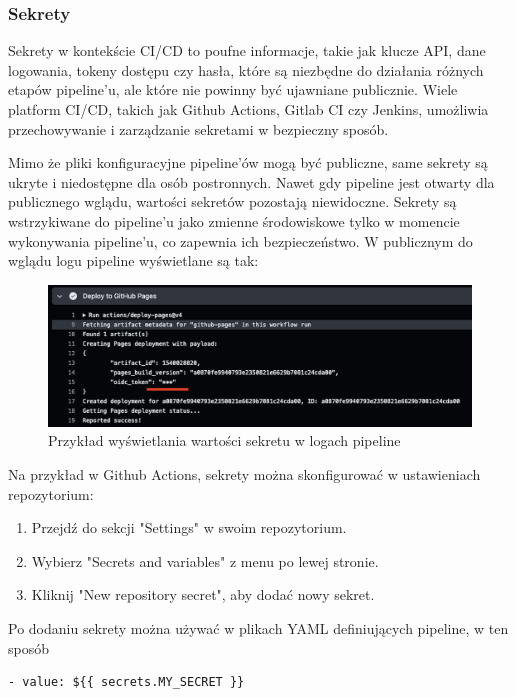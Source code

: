 \documentclass{article}
\begin{document}
\subsubsection{Sekrety}

Sekrety w kontekście CI/CD to poufne informacje, takie jak klucze API, dane logowania, tokeny dostępu czy hasła, które są niezbędne do działania różnych etapów pipeline'u, ale które nie powinny być ujawniane publicznie. Wiele platform CI/CD, takich jak Github Actions, Gitlab CI czy Jenkins, umożliwia przechowywanie i zarządzanie sekretami w bezpieczny sposób.

Mimo że pliki konfiguracyjne pipeline'ów mogą być publiczne, same sekrety są ukryte i niedostępne dla osób postronnych. Nawet gdy pipeline jest otwarty dla publicznego wglądu, wartości sekretów pozostają niewidoczne. Sekrety są wstrzykiwane do pipeline'u jako zmienne środowiskowe tylko w momencie wykonywania pipeline'u, co zapewnia ich bezpieczeństwo. W publicznym do wglądu logu pipeline wyświetlane są tak:

\begin{figure}[H]
    \centering
    \includegraphics[width=1\linewidth]{actionsLogSecrets.png}
    \caption{Przykład wyświetlania wartości sekretu w logach pipeline}
    \label{fig:enter-label}
\end{figure}

Na przykład w Github Actions, sekrety można skonfigurować w ustawieniach repozytorium:

\begin{enumerate}
\item Przejdź do sekcji "Settings" w swoim repozytorium.
\item Wybierz "Secrets and variables" z menu po lewej stronie.
\item Kliknij "New repository secret", aby dodać nowy sekret.
\end{enumerate}

Po dodaniu sekrety można używać w plikach YAML definiujących pipeline, w ten sposób

\begin{lstlisting}[caption=Przykładowa konfiguracja pipeline'u w Github Actions]
- value: ${{ secrets.MY_SECRET }}
\end{lstlisting}
\end{document}
